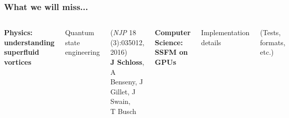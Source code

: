 \documentclass{beamer}
\begin{document}
\begin{frame}
\frametitle{What we will miss...}

\begin{columns}
\center
\textbf{Physics: understanding superfluid vortices}

\vspace{0.5cm}
Quantum state engineering

{\scriptsize (\textit{NJP} 18 (3):035012, 2016)} \\
{\scriptsize \textbf{J Schloss}, A Benseny, J Gillet, J Swain, \\ T Busch} \\

\center

\textbf{Computer Science: SSFM on GPUs}

\vspace{0.5cm}

Implementation details

{\scriptsize (Tests, formats, etc.)}
\vspace{0.7cm}

\end{columns}

\end{frame}
\end{document}
